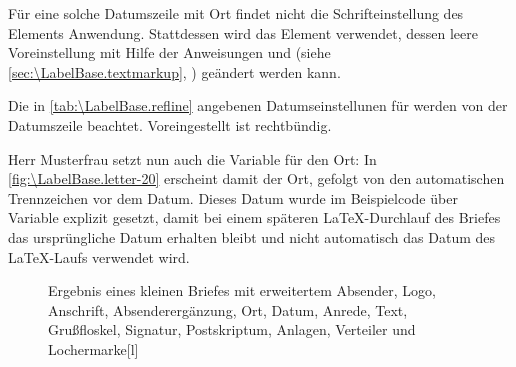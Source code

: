 \BeginIndexGroup
{}%
Für eine solche Datumszeile mit Ort findet
nicht die Schrifteinstellung des Elements
 Anwendung. Stattdessen wird das
Element 
verwendet, dessen leere Voreinstellung mit Hilfe der Anweisungen
 und
 (siehe
\autoref{sec:\LabelBase.textmarkup}, )
geändert werden kann.%
\EndIndexGroup

\iffalse%
Seit Version~3.09\ChangedAt{v3.09}{\Class{scrlttr2}} werden Ort und Datum
nicht mehr zwingend rechtsbündig ausgegeben. Stattdessen findet auch im Falle
der Datumszeile die Datumseinstellung von Option
\DescRef{\LabelBase.option.refline}\IndexOption{refline}%
\important{\DescRef{\LabelBase.option.refline}}, wie sie in
\autoref{tab:\LabelBase.refline} angegeben ist, Anwendung.%
\else%
Die in \autoref{tab:\LabelBase.refline} angebenen
Datumseinstellunen für
%
 werden von der
Datumszeile beachtet. Voreingestellt ist rechtbündig.%
\fi

\begin{Example}
  Herr Musterfrau setzt nun auch die Variable für den Ort:
  \iffalse%
  Damit erscheint vor dem Datum, wie in \autoref{fig:\LabelBase.letter-20} zu
  sehen, %
  \else%
  In \autoref{fig:\LabelBase.letter-20} erscheint damit %
  \fi %
  der Ort, gefolgt von den automatischen Trennzeichen vor dem Datum. Dieses
  Datum wurde im Beispielcode über Variable 
  explizit gesetzt, damit bei einem späteren \LaTeX-Durchlauf des Briefes das
  ursprüngliche Datum erhalten bleibt und nicht automatisch das Datum des
  \LaTeX-Laufs verwendet wird.
  \begin{figure}
    \setcapindent{0pt}%
    \begin{captionbeside}{Ergebnis eines kleinen Briefes mit erweitertem Absender,
        Logo, Anschrift, Absenderergänzung, Ort, Datum, Anrede,
        Text, Grußfloskel, Signatur, Postskriptum, Anlagen, Verteiler und
        Lochermarke}[l]
    \end{captionbeside}
    \label{fig:\LabelBase.letter-20}
  \end{figure}
\end{Example}%
\EndIndexGroup
\EndIndexGroup
\EndIndexGroup
\ExampleEndFix%


